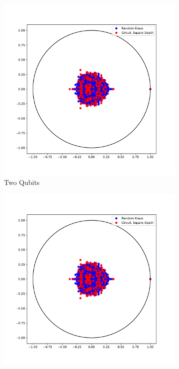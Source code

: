 \documentclass{article}
\begin{document}
\begin{figure}[htbp]
\begin{subfigure}[t]{0.3\textwidth}
    \includegraphics[width=\linewidth]{../figures/twoQubit_squareDepth}
\caption{Two Qubits}
\label{fig:figure14_7}
\end{subfigure}\hfill
\begin{subfigure}[t]{0.3\textwidth}
    \includegraphics[width=\linewidth]{../figures/twoQubit_squareDepth}

\end{subfigure}
\end{figure}
\end{document}
